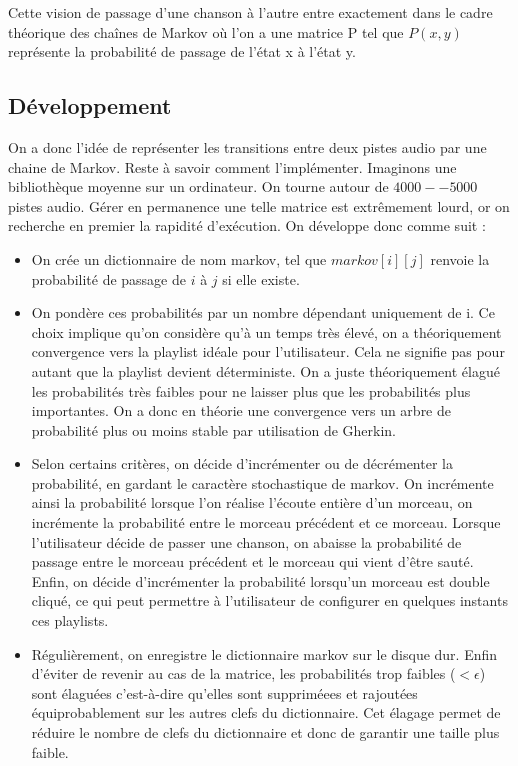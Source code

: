 \documentclass{report}
\begin{document}
Cette vision de passage d'une chanson à l'autre entre exactement dans le cadre théorique des chaînes de Markov où l'on a une matrice P tel que $P(x,y)$ représente la probabilité de passage de l'état x à l'état y.

\subsection{Développement}

On a donc l'idée de représenter les transitions entre deux pistes audio par une chaine de Markov. Reste à savoir comment l'implémenter. Imaginons une bibliothèque moyenne sur un ordinateur. On tourne autour de $4000 -- 5000$ pistes audio. Gérer en permanence une telle matrice est extrêmement lourd, or on recherche en premier la rapidité d'exécution. On développe donc comme suit :

\begin{itemize}
\item
On crée un dictionnaire de nom markov, tel que $markov[i][j]$ renvoie la probabilité de passage de $i$ à $j$ si elle existe.
\item
On pondère ces probabilités par un nombre dépendant uniquement de i. Ce choix implique qu'on considère qu'à un temps très élevé, on a théoriquement convergence vers la playlist idéale pour l'utilisateur. Cela ne signifie pas pour autant que la playlist devient déterministe. On a juste théoriquement élagué les probabilités très faibles pour ne laisser plus que les probabilités plus importantes. On a donc en théorie une convergence vers un arbre de probabilité plus ou
moins stable par utilisation de Gherkin.
\item
Selon certains critères, on décide d'incrémenter ou de décrémenter la probabilité, en gardant le caractère stochastique de markov. On incrémente ainsi la probabilité lorsque l'on réalise l'écoute entière d'un morceau, on incrémente la probabilité entre le morceau précédent et ce morceau. Lorsque l'utilisateur décide de passer une chanson, on abaisse la probabilité de passage entre le morceau précédent et le morceau qui vient d'être sauté. Enfin, on décide
d'incrémenter la probabilité lorsqu'un morceau est double cliqué, ce qui peut permettre à l'utilisateur de configurer en quelques instants ces playlists.
\item
Régulièrement, on enregistre le dictionnaire markov sur le disque dur. Enfin d'éviter de revenir au cas de la matrice, les probabilités trop faibles ($ < \epsilon$) sont élaguées c'est-à-dire qu'elles sont suppriméees et rajoutées équiprobablement sur les autres clefs du dictionnaire. Cet élagage permet de réduire le nombre de clefs du dictionnaire et donc de garantir une taille plus faible.
\end{itemize}
\end{document}
